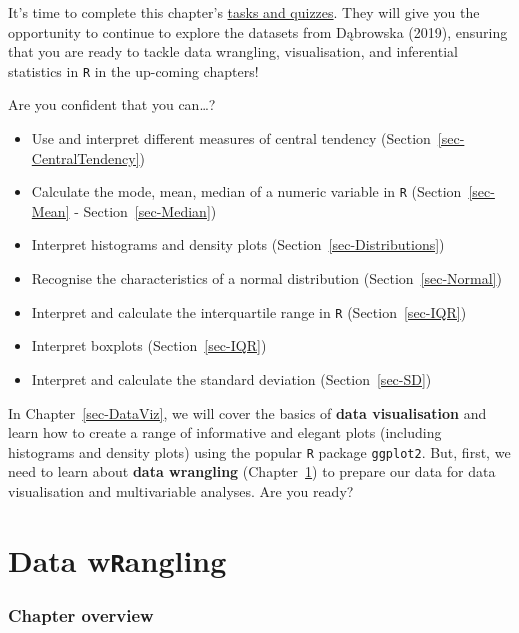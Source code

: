\documentclass[
  letterpaper,
  DIV=11,
  numbers=noendperiod]{scrreprt}
\providecommand{\tightlist}{%
  \setlength{\itemsep}{0pt}\setlength{\parskip}{0pt}}
\begin{document}
It's time to complete this chapter's
\href{https://elenlefoll.github.io/RstatsTextbook/quizzes/8_quiz.html}{tasks
and quizzes}. They will give you the opportunity to continue to explore
the datasets from Dąbrowska (2019), ensuring that you are ready to
tackle data wrangling, visualisation, and inferential statistics in
\texttt{R} in the up-coming chapters!

Are you confident that you can\ldots?

\begin{itemize}
\tightlist
\item[$\square$]
  Use and interpret different measures of central tendency
  (Section~\ref{sec-CentralTendency})
\item[$\square$]
  Calculate the mode, mean, median of a numeric variable in \texttt{R}
  (Section~\ref{sec-Mean} - Section~\ref{sec-Median})
\item[$\square$]
  Interpret histograms and density plots
  (Section~\ref{sec-Distributions})
\item[$\square$]
  Recognise the characteristics of a normal distribution
  (Section~\ref{sec-Normal})
\item[$\square$]
  Interpret and calculate the interquartile range in \texttt{R}
  (Section~\ref{sec-IQR})
\item[$\square$]
  Interpret boxplots (Section~\ref{sec-IQR})
\item[$\square$]
  Interpret and calculate the standard deviation (Section~\ref{sec-SD})
\end{itemize}

In Chapter~\ref{sec-DataViz}, we will cover the basics of \textbf{data
visualisation} and learn how to create a range of informative and
elegant plots (including histograms and density plots) using the popular
\texttt{R} package \texttt{ggplot2}. But, first, we need to learn about
\textbf{data wrangling} (Chapter~\ref{sec-DataWrangling}) to prepare our
data for data visualisation and multivariable analyses. Are you ready?


\chapter{\texorpdfstring{Data
w\texttt{R}angling}{Data wRangling}}\label{sec-DataWrangling}

\subsection*{Chapter overview}\label{chapter-overview-8}
\end{document}
